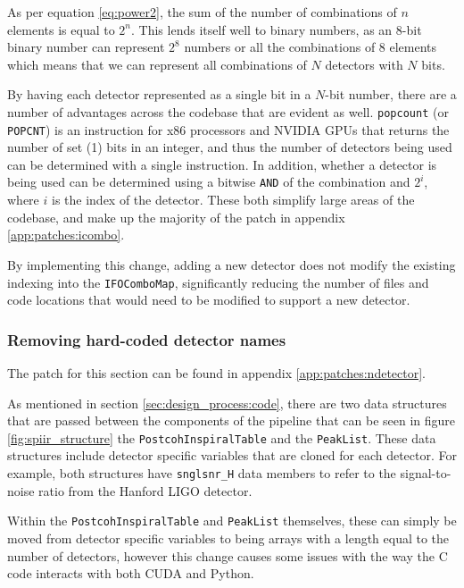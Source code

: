\documentclass{article}
\begin{document}
As per equation \ref{eq:power2}, the sum of the number of combinations of \(n\) elements is equal to \(2^n\).
This lends itself well to binary numbers, as an 8-bit binary number can represent \(2^8\) numbers or all the combinations of 8 elements \textemdash{} which means that we can represent all combinations of \(N\) detectors with \(N\) bits.

By having each detector represented as a single bit in a \(N\)-bit number, there are a number of advantages across the codebase that are evident as well.
\texttt{popcount} (or \texttt{POPCNT}) is an instruction for x86 processors and NVIDIA GPUs that returns the number of set (1) bits in an integer, and thus the number of detectors being used can be determined with a single instruction.
In addition, whether a detector is being used can be determined using a bitwise \texttt{AND} of the combination and \(2^{i}\), where \(i\) is the index of the detector.
These both simplify large areas of the codebase, and make up the majority of the patch in appendix \ref{app:patches:icombo}.

By implementing this change, adding a new detector does not modify the existing indexing into the \texttt{IFOComboMap}, significantly reducing the number of files and code locations that would need to be modified to support a new detector.

\subsubsection{Removing hard-coded detector names} \label{sec:final_design:patches:ndetector}

The patch for this section can be found in appendix \ref{app:patches:ndetector}.

As mentioned in section \ref{sec:design_process:code}, there are two data structures that are passed between the components of the pipeline that can be seen in figure \ref{fig:spiir_structure} \textemdash{} the \texttt{PostcohInspiralTable} and the \texttt{PeakList}.
These data structures include detector specific variables that are cloned for each detector.
For example, both structures have \texttt{snglsnr\_H} data members to refer to the signal-to-noise ratio from the Hanford LIGO detector.

Within the \texttt{PostcohInspiralTable} and \texttt{PeakList} themselves, these can simply be moved from detector specific variables to being arrays with a length equal to the number of detectors, however this change causes some issues with the way the C code interacts with both CUDA and Python.
\end{document}
